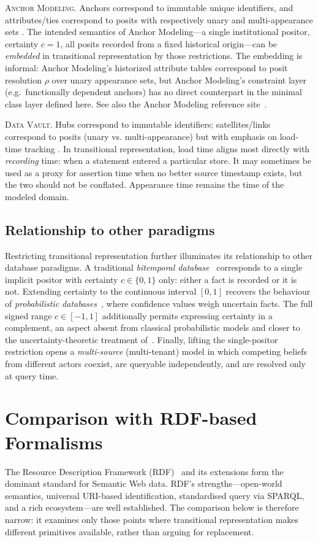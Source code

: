 \documentclass[a4paper,fleqn]{cas-sc}
\begin{document}
\textsc{Anchor Modeling.} Anchors correspond to immutable unique identifiers, and attributes/ties correspond to posits with respectively unary and multi-appearance sets \cite{RonnbackEtAl}. The intended semantics of Anchor Modeling---a single institutional positor, certainty \(c=1\), all posits recorded from a fixed historical origin---can be \emph{embedded} in transitional representation by those restrictions. The embedding is informal: Anchor Modeling's historized attribute tables correspond to posit resolution $\rho$ over unary appearance sets, but Anchor Modeling's constraint layer (e.g.\ functionally dependent anchors) has no direct counterpart in the minimal class layer defined here. See also the Anchor Modeling reference site~\cite{Anchor}.

\textsc{Data Vault.} Hubs correspond to immutable identifiers; satellites/links correspond to posits (unary vs. multi-appearance) but with emphasis on load-time tracking \cite{LinstedtEtAl,Hultgren}. In transitional representation, load time aligns most directly with \emph{recording} time: when a statement entered a particular store. It may sometimes be used as a proxy for assertion time when no better source timestamp exists, but the two should not be conflated. Appearance time remains the time of the modeled domain.

\subsection{Relationship to other paradigms}
Restricting transitional representation further illuminates its relationship to other database paradigms. A traditional \emph{bitemporal database}~\cite{Snodgrass} corresponds to a single implicit positor with certainty \(c\in\{0,1\}\) only: either a fact is recorded or it is not. Extending certainty to the continuous interval \([0,1]\) recovers the behaviour of \emph{probabilistic databases}~\cite{BenjellounEtAl}, where confidence values weigh uncertain facts. The full signed range \(c\in[-1,1]\) additionally permits expressing certainty in a complement, an aspect absent from classical probabilistic models and closer to the uncertainty-theoretic treatment of~\cite{Liu}. Finally, lifting the single-positor restriction opens a \emph{multi-source} (multi-tenant) model in which competing beliefs from different actors coexist, are queryable independently, and are resolved only at query time.

\section{Comparison with RDF-based Formalisms}
\label{Sec:rdf}
The Resource Description Framework (RDF)~\cite{RDF} and its extensions form the dominant standard for Semantic Web data. RDF's strengths---open-world semantics, universal URI-based identification, standardised query via SPARQL, and a rich ecosystem---are well established. The comparison below is therefore narrow: it examines only those points where transitional representation makes different primitives available, rather than arguing for replacement.
\end{document}
